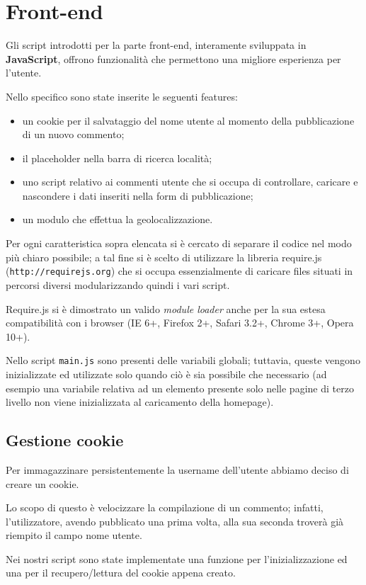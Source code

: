 \section{Front-end}
Gli script introdotti per la parte front-end, interamente sviluppata in
\textbf{JavaScript}, offrono funzionalità che permettono una migliore
esperienza per l'utente.


Nello specifico sono state inserite le seguenti features:
\begin{itemize}
\item un cookie per il salvataggio del nome utente al momento della
pubblicazione di un nuovo commento;
\item il placeholder nella barra di ricerca località;
\item uno script relativo ai commenti utente che si occupa di controllare,
caricare e nascondere i dati inseriti nella form di pubblicazione;
\item un modulo che effettua la geolocalizzazione.
\end{itemize} 
Per ogni caratteristica sopra elencata si è cercato di separare il codice nel
modo più chiaro possibile; a tal fine si è scelto di utilizzare la libreria
require.js (\texttt{http://requirejs.org}) che si occupa essenzialmente di
caricare files situati in percorsi diversi modularizzando quindi i vari
script.


Require.js si è dimostrato un valido \textit{module loader} anche per la sua
estesa compatibilità con i browser (IE 6+, Firefox 2+, Safari 3.2+, Chrome
3+, Opera 10+).

Nello script \texttt{main.js} sono presenti delle variabili globali; tuttavia,
queste vengono inizializzate ed utilizzate solo quando ciò è sia possibile che
necessario (ad esempio una variabile relativa ad un elemento presente solo
nelle pagine di terzo livello non viene inizializzata al caricamento della
homepage).

\subsection{Gestione cookie}
Per immagazzinare persistentemente la username dell'utente abbiamo deciso di
creare un cookie.

Lo scopo di questo è velocizzare la compilazione di un commento; infatti,
l'utilizzatore, avendo pubblicato una prima volta, alla sua seconda troverà
già riempito il campo nome utente.

Nei nostri script sono state implementate una funzione per l'inizializzazione
ed una per il recupero/lettura del cookie appena creato.


